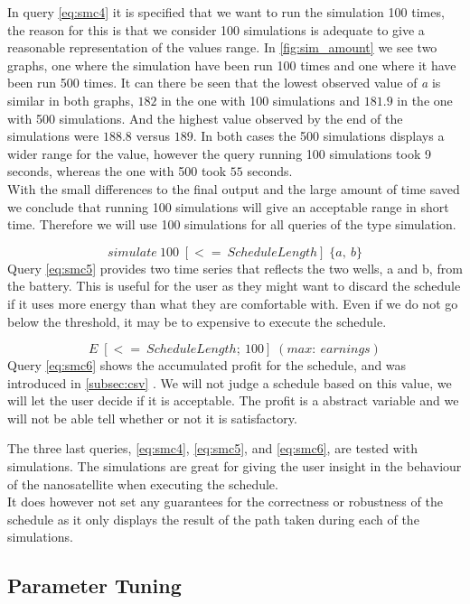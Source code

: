 In query \ref{eq:smc4} it is specified that we want to run the simulation 100 times, the reason for this is that we consider 100 simulations is adequate to give a reasonable representation of the values range. In \cref{fig:sim_amount} we see two graphs, one where the simulation have been run 100 times and one where it have been run 500 times. It can there be seen that the lowest observed value of \textit{a} is similar in both graphs, $182$ in the one with 100 simulations and $181.9$ in the one with 500 simulations. And the highest value observed by the end of the simulations were $188.8$ versus $189$. In both cases the 500 simulations displays a wider range for the value, however the query running 100 simulations took 9 seconds, whereas the one with 500 took $55$ seconds.\\
With the small differences to the final output and the large amount of time saved we conclude that running 100 simulations will give an acceptable range in short time. Therefore we will use 100 simulations for all queries of the type simulation.

\begin{equation} \label{eq:smc5}
	simulate\ 100 \; [<=\ ScheduleLength]\; \{ a,\ b\}
\end{equation}
Query \ref{eq:smc5} provides two time series that reflects the two wells, a and b, from the battery. This is useful for the user as they might want to discard the schedule if it uses more energy than what they are comfortable with. Even if we do not go below the threshold, it may be to expensive to execute the schedule. %

\begin{equation} \label{eq:smc6}
	E \; [<=\ ScheduleLength;\ 100]\; ( max:\ earnings)
\end{equation}
Query \ref{eq:smc6} shows the accumulated profit for the schedule, and was introduced in \cref{subsec:csv} . We will not judge a schedule based on this value, we will let the user decide if it is acceptable. The profit is a abstract variable and we will not be able tell whether or not it is satisfactory.


The three last queries, \ref{eq:smc4}, \ref{eq:smc5}, and \ref{eq:smc6}, are tested with simulations. The simulations are great for giving the user insight in the behaviour of the nanosatellite when executing the schedule. \\
It does however not set any guarantees for the correctness or robustness of the schedule as it only displays the result of the path taken during each of the simulations.



\subsection{Parameter Tuning}

